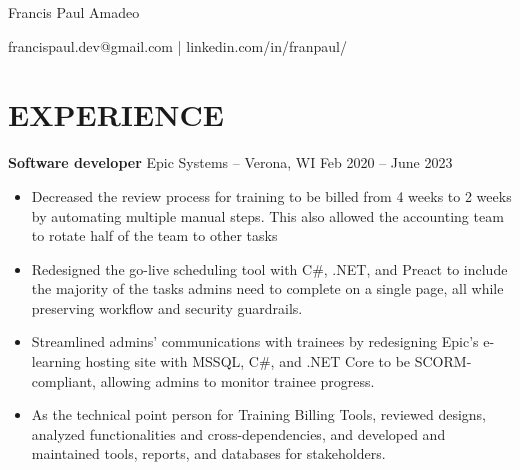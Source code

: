 \documentclass[11pt,letterpaper]{article}
\begin{document}
\centerline{\Huge Francis Paul Amadeo}
\centerline{francispaul.dev@gmail.com | linkedin.com/in/franpaul/}

\section*{EXPERIENCE}

\textbf{Software developer} Epic Systems -- Verona, WI \hfill Feb 2020 -- June 2023 \\
\vspace{-10pt}
\begin{itemize}
  \item Decreased the review process for training to be billed from 4 weeks to 2 weeks by automating multiple manual steps. This also allowed the accounting team to rotate half of the team to other tasks
  \item Redesigned the go-live scheduling tool with C\#, .NET, and Preact to include the majority of the tasks admins need to complete on a single page, all while preserving workflow and security guardrails.
  \item Streamlined admins' communications with trainees by redesigning Epic's e-learning hosting site with MSSQL, C\#, and .NET Core to be SCORM-compliant, allowing admins to monitor trainee progress.
  \item As the technical point person for Training Billing Tools, reviewed designs, analyzed functionalities and cross-dependencies, and developed and maintained tools, reports, and databases for stakeholders.

\end{itemize}
\end{document}
